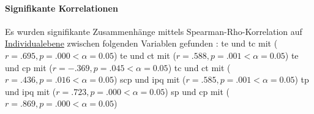\documentclass[a4paper,11pt]{article}%
\renewcommand{\\}{\vspace*{0.5\baselineskip} \newline}
\begin{document}
\paragraph{Signifikante Korrelationen}
Es wurden signifikante Zusammenhänge mittels Spearman-Rho-Korrelation auf \underline{Individualebene} zwischen folgenden Variablen gefunden :\newline
\acs{te} und \acs{tc} mit ($r = .695, p = .000 < \alpha = 0.05$)\newline
\acs{te} und \acs{ct} mit ($r = .588, p = .001 < \alpha = 0.05$)\newline
\acs{te} und \acs{cp} mit ($r = -.369, p = .045 < \alpha = 0.05$)\newline
\acs{tc} und \acs{ct} mit ($r = .436, p = .016 < \alpha = 0.05$)\newline
\acs{scp} und \acs{ipq} mit ($r = .585, p = .001 < \alpha = 0.05$)\newline
\acs{tp} und \acs{ipq} mit ($r = .723, p = .000 < \alpha = 0.05$)\newline
\acs{sp} und \acs{cp} mit ($r = .869, p = .000 < \alpha = 0.05$)\newline
\end{document}
